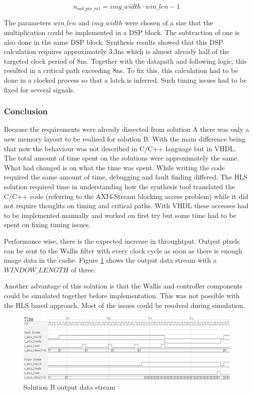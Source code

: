 \begin{equation}
    n_{out\_pix\_m1} = img\_width \cdot win\_len - 1
    \label{eq:noutpix}
\end{equation}

The parameters $win\_len$ and $img\_width$ were chosen of a size that the
multiplication could
be implemented in a DSP block. The subtraction of one is also done in the same
DSP block. Synthesis results showed that this DSP calculation requires
approximately 3.3ns
which is almost already half of the targeted clock period of 8ns. Together with
the datapath and following logic, this resulted in a critical path exceeding
8ns. To fix this,
this calculation had to be done in a clocked process so that a latch is
inferred. Such timing issues had to be fixed for several signals.

% 
\subsubsection*{Conclusion}
Because the requirements were already dissected from solution A there was only a
new memory layout to be realised for solution B. With the main difference being
that now the behaviour was not described in C/C++ language but in VHDL. The
total
amount of time spent on the solutions were approximately the same. What had
changed is on what the time was spent. While writing the code required the same
amount of time, debugging and fault finding differed. The HLS solution required
time in understanding how the synthesis tool translated the C/C++ code (referring
to the AXI4-Stream blocking access problem) while it did not require thoughts on
timing
and critical paths. With VHDL these accesses had to be implemented manually and
worked on first try but some time had to be spent on fixing timing issues.

Performance wise, there is the expected increase in throughtput. Output pixels
can be sent to the Wallis filter with every clock cycle as soon as there is
enough image data in the cache. Figure \ref{fig:tracesolb} shows the output data
stream with a $WINDOW\_LENGTH$ of three. 

Another advantage of this solution is that the Wallis and controller components
could be simulated together before implementation. This was not possible with
the HLS based approach. Most of the issues could be resolved during simulation.

\begin{figure}[h!]
    \centering
    \includegraphics[width=\textwidth]{images/controller/vhdlcontrollerout.png}
    \caption{Solution B output data stream}
    \label{fig:tracesolb}
\end{figure}



